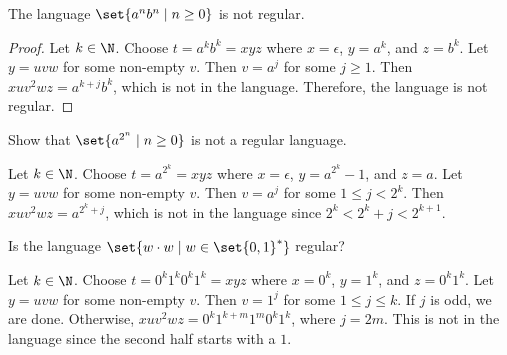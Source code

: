 \begin{proposition}
    The language $\set{a^n b^n \mid n \ge 0}$ is not regular.
\end{proposition}
\begin{proof}
    Let $k \in \N$.
    Choose $t = a^k b^k = xyz$ where $x = \epsilon$, $y = a^k$, and $z = b^k$.
    Let $y = uvw$ for some non-empty $v$.
    Then $v = a^j$ for some $j \ge 1$.
    Then $x u v^2 w z = a^{k + j} b^k$, which is not in the language.
    Therefore, the language is not regular.
\end{proof}

\begin{exercise}
    Show that $\set{a^{2^n} \mid n \ge 0}$ is not a regular language.
\end{exercise}
\begin{solution}
    Let $k \in \N$.
    Choose $t = a^{2^k} = xyz$ where $x = \epsilon$, $y = a^{2^k} - 1$, and
    $z = a$.
    Let $y = uvw$ for some non-empty $v$.
    Then $v = a^j$ for some $1 \le j < 2^k$.
    Then $x u v^2 w z = a^{2^k + j}$, which is not in the language
    since $2^k < 2^k + j < 2^{k + 1}$.
\end{solution}

\begin{exercise}
    Is the language $\set{w \cdot w \mid w \in \set{0, 1}^*}$ regular?
\end{exercise}
\begin{solution}
    Let $k \in \N$.
    Choose $t = 0^k 1^k 0^k 1^k = xyz$ where $x = 0^k$, $y = 1^k$, and
    $z = 0^k 1^k$.
    Let $y = uvw$ for some non-empty $v$.
    Then $v = 1^j$ for some $1 \le j \le k$.
    If $j$ is odd, we are done.
    Otherwise, $x u v^2 w z = 0^k 1^{k + m} 1^m 0^k 1^k$, where $j = 2m$.
    This is not in the language since the second half starts with a $1$.
\end{solution}
